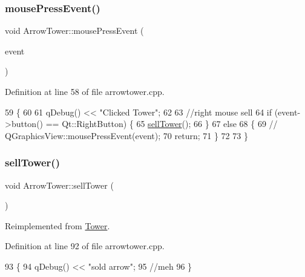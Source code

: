 \subsubsection{\texorpdfstring{mouse\+Press\+Event()}{mousePressEvent()}}
{\footnotesize\ttfamily void Arrow\+Tower\+::mouse\+Press\+Event (\begin{DoxyParamCaption}\item[{Q\+Graphics\+Scene\+Mouse\+Event $\ast$}]{event }\end{DoxyParamCaption})}



Definition at line 58 of file arrowtower.\+cpp.


\begin{DoxyCode}
59 \{
60 
61    qDebug() << \textcolor{stringliteral}{"Clicked Tower"};
62 
63    \textcolor{comment}{//right mouse sell}
64     \textcolor{keywordflow}{if} (event->button() == Qt::RightButton) \{
65         \hyperlink{class_arrow_tower_a7ac5bf2863d8a4c461d26a3a60dc62ab}{sellTower}();
66     \}
67     \textcolor{keywordflow}{else}
68     \{
69         \textcolor{comment}{//        QGraphicsView::mousePressEvent(event);}
70         \textcolor{keywordflow}{return};
71     \}
72 
73 \}
\end{DoxyCode}
\mbox{\label{class_arrow_tower_a7ac5bf2863d8a4c461d26a3a60dc62ab}} 
\subsubsection{\texorpdfstring{sell\+Tower()}{sellTower()}}
{\footnotesize\ttfamily void Arrow\+Tower\+::sell\+Tower (\begin{DoxyParamCaption}{ }\end{DoxyParamCaption})\hspace{0.3cm}{\ttfamily [virtual]}}



Reimplemented from \hyperlink{class_tower_a7736b1132e64e14a977e9e8c91c3338f}{Tower}.



Definition at line 92 of file arrowtower.\+cpp.


\begin{DoxyCode}
93 \{
94     qDebug() << \textcolor{stringliteral}{"sold arrow"};
95     \textcolor{comment}{//meh}
96 \}
\end{DoxyCode}


